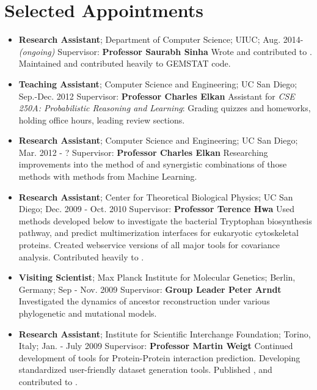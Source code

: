 \section*{Selected Appointments}
\begin{itemize}
	\item {\bf Research Assistant}; Department of Computer Science; UIUC; Aug. 2014-{\it (ongoing) }
		\subitem Supervisor: {\bf Professor Saurabh Sinha}
		\subitem Wrote \cite{Lunt393835} and contributed to \cite{Tabe-Bordbar2020.11.08.373555,Khajouei2020.02.07.939264} . Maintained and contributed heavily to GEMSTAT code.
		
	\item {\bf Teaching Assistant}; Computer Science and Engineering; UC San Diego; Sep.-Dec. 2012
		\subitem Supervisor: {\bf Professor Charles Elkan }
		\subitem Assistant for {\it CSE 250A: Probabilistic Reasoning and Learning}: Grading quizzes and homeworks, holding office hours, leading review sections.
		
	\item {\bf Research Assistant}; Computer Science and Engineering; UC San Diego; Mar. 2012 - ?
		\subitem Supervisor: {\bf Professor Charles Elkan }
		\subitem Researching improvements into the method of \cite{MorcosE1293,10.1371/journal.pone.0019729} and synergistic combinations of those methods with methods from Machine Learning.
	
	\item {\bf Research Assistant}; Center for Theoretical Biological Physics; UC San Diego; Dec. 2009 - Oct. 2010
		\subitem Supervisor: {\bf Professor Terence Hwa }
		\subitem Used methods developed below to investigate the bacterial Tryptophan biosynthesis pathway, and predict multimerization interfaces for eukaryotic cytoskeletal proteins. Created webservice versions of all major tools for covariance analysis. Contributed heavily to \cite{MorcosE1293,10.1371/journal.pone.0019729}.
	
	\item {\bf Visiting Scientist}; Max Planck Institute for Molecular Genetics; Berlin, Germany; Sep - Nov. 2009
		\subitem Supervisor: {\bf Group Leader Peter Arndt }
		\subitem Investigated the dynamics of ancestor reconstruction under various phylogenetic and mutational models.
	
	\item {\bf Research Assistant}; Institute for Scientific Interchange Foundation; Torino, Italy; Jan. - July 2009
		\subitem Supervisor: {\bf Professor Martin Weigt }
		\subitem Continued development of tools for Protein-Protein interaction prediction. Developing standardized user-friendly dataset generation tools. Published \cite{LUNT201017}, and contributed to \cite{pmid24603210}.
	

\end{itemize}
